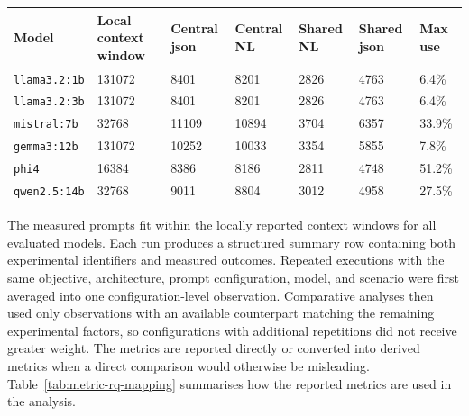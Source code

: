 \begin{center}
\begingroup
\scriptsize
\setlength{\tabcolsep}{2pt}
\renewcommand{\arraystretch}{0.92}
\captionsetup{type=table,hypcap=false}
\begin{tabular}{|p{}|p{}|p{}|p{}|p{}|p{}|p{}|}
\hline
\textbf{Model} & \textbf{Local context window} & \textbf{Central \gls{json}} & \textbf{Central NL} & \textbf{Shared NL} & \textbf{Shared \gls{json}} & \textbf{Max use} \\
\hline
\nolinkurl{llama3.2:1b} & 131072 & 8401 & 8201 & 2826 & 4763 & 6.4\% \\
\hline
\nolinkurl{llama3.2:3b} & 131072 & 8401 & 8201 & 2826 & 4763 & 6.4\% \\
\hline
\nolinkurl{mistral:7b} & 32768 & 11109 & 10894 & 3704 & 6357 & 33.9\% \\
\hline
\nolinkurl{gemma3:12b} & 131072 & 10252 & 10033 & 3354 & 5855 & 7.8\% \\
\hline
\nolinkurl{phi4} & 16384 & 8386 & 8186 & 2811 & 4748 & 51.2\% \\
\hline
\nolinkurl{qwen2.5:14b} & 32768 & 9011 & 8804 & 3012 & 4958 & 27.5\% \\
\hline
\end{tabular}
\caption{Locally reported Ollama context windows and prompt-token usage for representative prompts from \nolinkurl{medium_balanced_4v4}.}
\label{tab:context-diagnostic}
\endgroup
\end{center}

The measured prompts fit within the locally reported context windows for all evaluated models.
Each run produces a structured summary row containing both experimental identifiers and measured outcomes.
Repeated executions with the same objective, architecture, prompt configuration, model, and scenario were first averaged into one configuration-level observation.
Comparative analyses then used only observations with an available counterpart matching the remaining experimental factors, so configurations with additional repetitions did not receive greater weight.
The metrics are reported directly or converted into derived metrics when a direct comparison would otherwise be misleading.
Table~\ref{tab:metric-rq-mapping} summarises how the reported metrics are used in the analysis.


